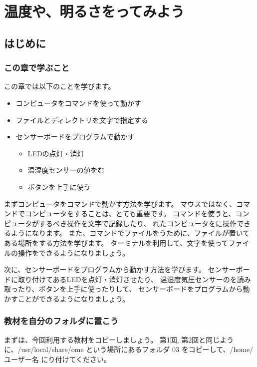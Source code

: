 \chapter{温度や、明るさをってみよう}
\section{はじめに}
\subsection{この章で学ぶこと}
この章では以下のことを学びます。

\begin{itemize}
  \item コンピュータをコマンドを使って動かす
  \item ファイルとディレクトリを文字で指定する
  \item センサーボードをプログラムで動かす
  \begin{itemize}
    \item LEDの点灯・消灯
    \item 温湿度センサーの値をむ
    \item ボタンを上手に使う
  \end{itemize}
\end{itemize}

まずコンピュータをコマンドで動かす方法を学びます。
マウスではなく、コマンドでコンピュータをすることは、とても重要です。
コマンドを使うと、コンピュータがするべき操作を文字で記録したり、
れたコンピュータをに操作できるようになります。
また、コマンドでファイルをうために、ファイルが置いてある場所をする方法を学びます。
ターミナルを利用して、文字を使ってファイルの操作をできるようになりましょう。

次に、センサーボードをプログラムから動かす方法を学びます。
センサーボードに取り付けてあるLEDを点灯・消灯させたり、
温湿度気圧センサーのを読み取ったり、ボタンを上手に使ったりして、
センサーボードをプログラムから動かすことができるようになりましょう。

\subsection{教材を自分のフォルダに置こう}
まずは、今回利用する教材をコピーしましょう。
第1回, 第2回と同じように、\nobreak/usr/local/share/ome という場所にあるフォルダ 03 をコピーして、/home/ユーザー名 にり付けてください。

